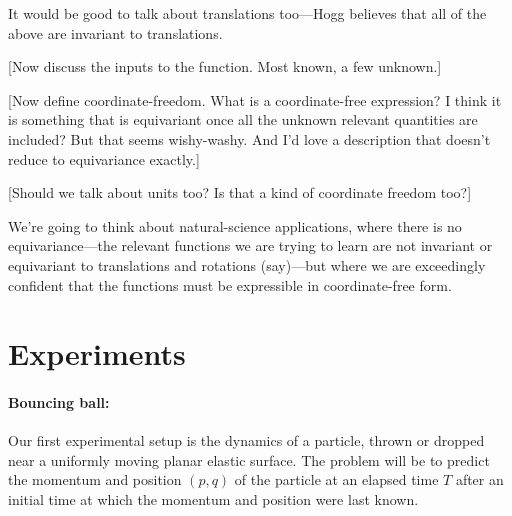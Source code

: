 \documentclass[12pt]{article}
\begin{document}
It would be good to talk about translations too---Hogg believes that all of the above are invariant to translations.

[Now discuss the inputs to the function. Most known, a few unknown.]

[Now define coordinate-freedom. What is a coordinate-free expression? I think it is something that is equivariant once all the unknown relevant quantities are included? But that seems wishy-washy. And I'd love a description that doesn't reduce to equivariance exactly.]

[Should we talk about units too? Is that a kind of coordinate freedom too?]

We're going to think about natural-science applications, where there is no equivariance---the relevant functions we are trying to learn are not invariant or equivariant to translations and rotations (say)---but where we are exceedingly confident that the functions must be expressible in coordinate-free form.

\section{Experiments}

\paragraph{Bouncing ball:}
Our first experimental setup is the dynamics of a particle, thrown or dropped near a uniformly moving planar elastic surface.
The problem will be to predict the momentum and position $(p,q)$ of the particle at an elapsed time $T$ after an initial time at which the momentum and position were last known.
\end{document}
